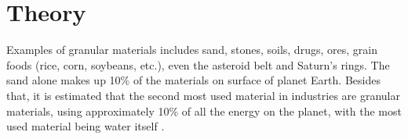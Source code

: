 
\section{Theory}
\label{subsection:Teoria}


    Examples of granular materials includes sand, stones, soils, drugs, ores, grain foods (rice, corn, soybeans, etc.), even the asteroid belt and Saturn's rings. The sand alone makes up 10\% of the materials on surface of planet Earth. Besides that, it is estimated that the second most used material in industries are granular materials, using approximately 10\% of all the energy on the planet, with the most used material being water itself \cite{Sands_Powders_and_Grains}.


